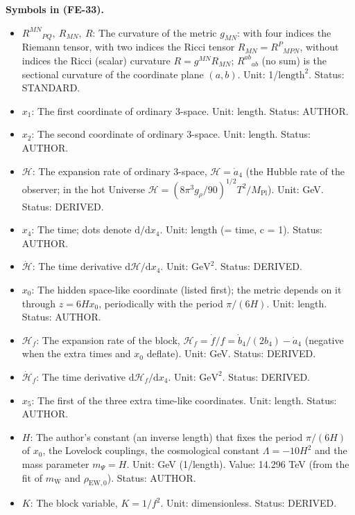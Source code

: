 \documentclass[
  10pt,
]{article}
\providecommand{\tightlist}{%
  \setlength{\itemsep}{0pt}\setlength{\parskip}{0pt}}
\begin{document}
\textbf{Symbols in (FE-33).}

\begin{itemize}
\tightlist
\item
  \(R^{MN}{}_{PQ},\ R_{MN},\ R\): The curvature of the metric
  \(g_{MN}\): with four indices the Riemann tensor, with two indices the
  Ricci tensor \(R_{MN} = R^P{}_{MPN}\), without indices the Ricci
  (scalar) curvature \(R = g^{MN}R_{MN}\); \(R^{ab}{}_{ab}\) (no sum) is
  the sectional curvature of the coordinate plane \((a, b)\). Unit:
  1/\(\mathrm{length}^{2}\). Status: STANDARD.
\item
  \(x_1\): The first coordinate of ordinary 3-space. Unit: length.
  Status: AUTHOR.
\item
  \(x_2\): The second coordinate of ordinary 3-space. Unit: length.
  Status: AUTHOR.
\item
  \(\mathcal{H}\): The expansion rate of ordinary 3-space,
  \(\mathcal{H} = \dot a_4\) (the Hubble rate of the observer; in the
  hot Universe
  \(\mathcal{H} = (8\pi^3g_\rho/90)^{1/2}T^2/M_{\mathrm{Pl}}\)). Unit:
  GeV. Status: DERIVED.
\item
  \(x_4\): The time; dots denote \(\mathrm{d}/\mathrm{d}x_4\). Unit:
  length (= time, c = 1). Status: AUTHOR.
\item
  \(\dot{\mathcal{H}}\): The time derivative
  \(\mathrm{d}\mathcal{H}/\mathrm{d}x_4\). Unit: \(\mathrm{GeV}^{2}\).
  Status: DERIVED.
\item
  \(x_0\): The hidden space-like coordinate (listed first); the metric
  depends on it through \(z = 6Hx_0\), periodically with the period
  \(\pi/(6H)\). Unit: length. Status: AUTHOR.
\item
  \(\mathcal{H}_f\): The expansion rate of the block,
  \(\mathcal{H}_f = \dot f/f = \dot b_4/(2b_4) - \dot a_4\) (negative
  when the extra times and \(x_0\) deflate). Unit: GeV. Status: DERIVED.
\item
  \(\dot{\mathcal{H}}_f\): The time derivative
  \(\mathrm{d}\mathcal{H}_f/\mathrm{d}x_4\). Unit: \(\mathrm{GeV}^{2}\).
  Status: DERIVED.
\item
  \(x_5\): The first of the three extra time-like coordinates. Unit:
  length. Status: AUTHOR.
\item
  \(H\): The author's constant (an inverse length) that fixes the period
  \(\pi/(6H)\) of \(x_0\), the Lovelock couplings, the cosmological
  constant \(\Lambda = -10H^2\) and the mass parameter \(m_\Psi = H\).
  Unit: GeV (1/length). Value: 14.296 TeV (from the fit of
  \(m_{\mathrm{W}}\) and \(\rho_{\mathrm{EW},0}\)). Status: AUTHOR.
\item
  \(K\): The block variable, \(K = 1/f^2\). Unit: dimensionless. Status:
  DERIVED.
\end{itemize}
\end{document}
